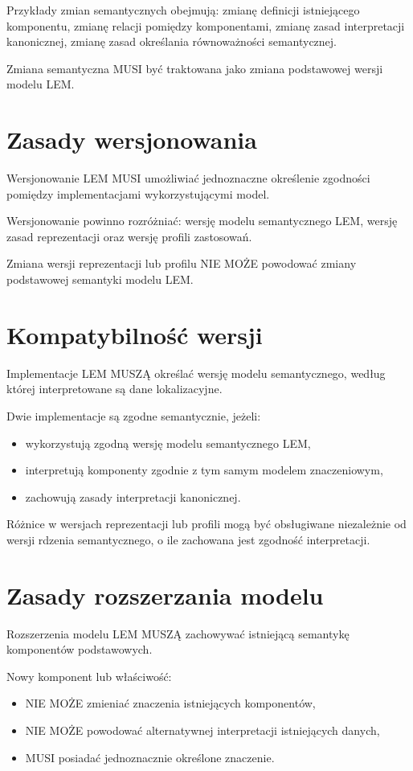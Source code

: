 Przykłady zmian semantycznych obejmują: zmianę definicji istniejącego komponentu, zmianę relacji pomiędzy komponentami, zmianę zasad interpretacji kanonicznej, zmianę zasad określania równoważności semantycznej.

Zmiana semantyczna MUSI być traktowana jako zmiana podstawowej wersji modelu LEM.

\section{Zasady wersjonowania}
Wersjonowanie LEM MUSI umożliwiać jednoznaczne określenie zgodności pomiędzy implementacjami wykorzystującymi model.

Wersjonowanie powinno rozróżniać: wersję modelu semantycznego LEM, wersję zasad reprezentacji oraz wersję profili zastosowań.

Zmiana wersji reprezentacji lub profilu NIE MOŻE powodować zmiany podstawowej semantyki modelu LEM.

\section{Kompatybilność wersji}
Implementacje LEM MUSZĄ określać wersję modelu semantycznego, według której interpretowane są dane lokalizacyjne.

Dwie implementacje są zgodne semantycznie, jeżeli:
\begin{itemize}
    \item wykorzystują zgodną wersję modelu semantycznego LEM,
    \item interpretują komponenty zgodnie z tym samym modelem znaczeniowym,
    \item zachowują zasady interpretacji kanonicznej.
\end{itemize}

Różnice w wersjach reprezentacji lub profili mogą być obsługiwane niezależnie od wersji rdzenia semantycznego, o ile zachowana jest zgodność interpretacji.

\section{Zasady rozszerzania modelu}
Rozszerzenia modelu LEM MUSZĄ zachowywać istniejącą semantykę komponentów podstawowych.

Nowy komponent lub właściwość:
\begin{itemize}
    \item NIE MOŻE zmieniać znaczenia istniejących komponentów,
    \item NIE MOŻE powodować alternatywnej interpretacji istniejących danych,
    \item MUSI posiadać jednoznacznie określone znaczenie.
\end{itemize}

